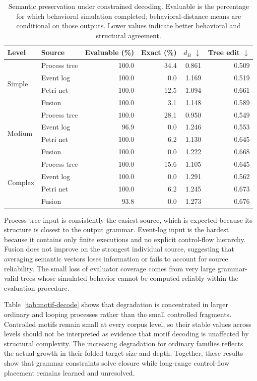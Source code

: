 \documentclass[pdflatex,sn-basic]{sn-jnl}
\begin{document}
\begin{table}[!t]
\centering
\caption{Semantic preservation under constrained decoding. Evaluable is the percentage for which behavioral simulation completed; behavioral-distance means are conditional on those outputs. Lower values indicate better behavioral and structural agreement.}
\label{tab:decode}
\begin{tabular}{@{}llrrrr@{}}
\toprule
Level & Source & Evaluable (\%) & Exact (\%) & $d_B$ $\downarrow$ & Tree edit $\downarrow$ \\
\midrule
\multirow{4}{*}{Simple}
 & Process tree & 100.0 & 34.4 & 0.861 & 0.509 \\
 & Event log    & 100.0 & 0.0  & 1.169 & 0.519 \\
 & Petri net    & 100.0 & 12.5 & 1.094 & 0.661 \\
 & Fusion       & 100.0 & 3.1  & 1.148 & 0.589 \\
\midrule
\multirow{4}{*}{Medium}
 & Process tree & 100.0 & 28.1 & 0.950 & 0.549 \\
 & Event log    & 96.9  & 0.0  & 1.246 & 0.553 \\
 & Petri net    & 100.0 & 6.2  & 1.130 & 0.645 \\
 & Fusion       & 100.0 & 0.0  & 1.222 & 0.668 \\
\midrule
\multirow{4}{*}{Complex}
 & Process tree & 100.0 & 15.6 & 1.105 & 0.645 \\
 & Event log    & 100.0 & 0.0  & 1.291 & 0.562 \\
 & Petri net    & 100.0 & 6.2  & 1.245 & 0.673 \\
 & Fusion       & 93.8  & 0.0  & 1.273 & 0.676 \\
\bottomrule
\end{tabular}
\end{table}

Process-tree input is consistently the easiest source, which is expected because its structure is closest to the output grammar. Event-log input is the hardest because it contains only finite executions and no explicit control-flow hierarchy. Fusion does not improve on the strongest individual source, suggesting that averaging semantic vectors loses information or fails to account for source reliability. The small loss of evaluator coverage comes from very large grammar-valid trees whose simulated behavior cannot be computed reliably within the evaluation procedure.

Table~\ref{tab:motif-decode} shows that degradation is concentrated in larger ordinary and looping processes rather than the small controlled fragments. Controlled motifs remain small at every corpus level, so their stable values across levels should not be interpreted as evidence that motif decoding is unaffected by structural complexity. The increasing degradation for ordinary families reflects the actual growth in their folded target size and depth. Together, these results show that grammar constraints solve closure while long-range control-flow placement remains learned and unresolved.
\end{document}
